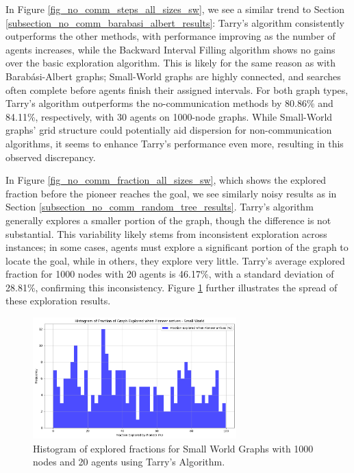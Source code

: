 In Figure \ref{fig_no_comm_steps_all_sizes_sw}, we see a similar trend to Section \ref{subsection_no_comm_barabasi_albert_results}: Tarry's algorithm consistently outperforms the other methods, with performance improving as the number of agents increases, while the Backward Interval Filling algorithm shows no gains over the basic exploration algorithm. This is likely for the same reason as with Barabási-Albert graphs; Small-World graphs are highly connected, and searches often complete before agents finish their assigned intervals. For both graph types, Tarry's algorithm outperforms the no-communication methods by 80.86\% and 84.11\%, respectively, with 30 agents on 1000-node graphs. While Small-World graphs' grid structure could potentially aid dispersion for non-communication algorithms, it seems to enhance Tarry's performance even more, resulting in this observed discrepancy.

In Figure \ref{fig_no_comm_fraction_all_sizes_sw}, which shows the explored fraction before the pioneer reaches the goal, we see similarly noisy results as in Section \ref{subsection_no_comm_random_tree_results}. Tarry's algorithm generally explores a smaller portion of the graph, though the difference is not substantial. This variability likely stems from inconsistent exploration across instances; in some cases, agents must explore a significant portion of the graph to locate the goal, while in others, they explore very little. Tarry's average explored fraction for 1000 nodes with 20 agents is 46.17\%, with a standard deviation of 28.81\%, confirming this inconsistency. Figure \ref{fig_no_comm_fraction_histogram_sw} further illustrates the spread of these exploration results.

\begin{figure}[H]
    \centering 
    \includegraphics[width=0.7\textwidth]{Cap3/no_comm_fraction_histogram_sw.png} 
    \caption{Histogram of explored fractions for Small World Graphs with 1000 nodes and 20 agents using Tarry's Algorithm.} 
    \label{fig_no_comm_fraction_histogram_sw}
\end{figure}


